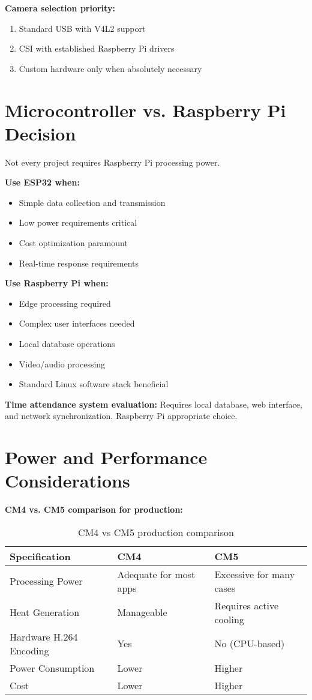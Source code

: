 \textbf{Camera selection priority:}
\begin{enumerate}
\item Standard USB with V4L2 support
\item CSI with established Raspberry Pi drivers
\item Custom hardware only when absolutely necessary
\end{enumerate}

\section{Microcontroller vs. Raspberry Pi Decision}

Not every project requires Raspberry Pi processing power.

\textbf{Use ESP32 when:}
\begin{itemize}
\item Simple data collection and transmission
\item Low power requirements critical
\item Cost optimization paramount
\item Real-time response requirements
\end{itemize}

\textbf{Use Raspberry Pi when:}
\begin{itemize}
\item Edge processing required
\item Complex user interfaces needed
\item Local database operations
\item Video/audio processing
\item Standard Linux software stack beneficial
\end{itemize}

\textbf{Time attendance system evaluation:} Requires local database, web interface, and network synchronization. Raspberry Pi appropriate choice.

\section{Power and Performance Considerations}

\textbf{CM4 vs. CM5 comparison for production:}

\begin{table}[h]
\centering
\begin{tabular}{|l|p{2.5cm}|p{2.5cm}|}
\hline
\textbf{Specification} & \textbf{CM4} & \textbf{CM5} \\
\hline
Processing Power & Adequate for most apps & Excessive for many cases \\
Heat Generation & Manageable & Requires active cooling \\
Hardware H.264 Encoding & Yes & No (CPU-based) \\
Power Consumption & Lower & Higher \\
Cost & Lower & Higher \\
\hline
\end{tabular}
\caption{CM4 vs CM5 production comparison}
\end{table}

